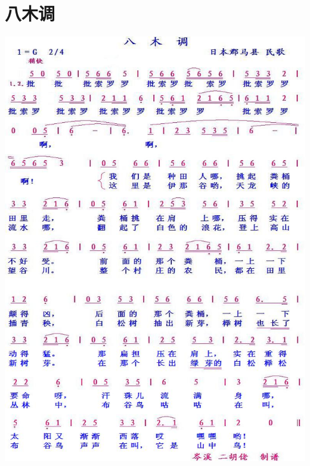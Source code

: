 \documentclass[cn,pad,chinese,chinesefont=nofont]{elegantbook}
\begin{document}
\section{八木调}
	\includegraphics[height=0.9\textheight]{dongxiao/日本-八木调.jpg}
\end{document}
